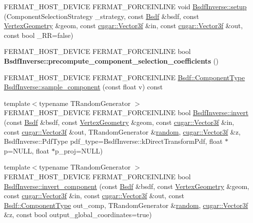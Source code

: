 \begin{DoxyCompactItemize}
\item 
F\+E\+R\+M\+A\+T\+\_\+\+H\+O\+S\+T\+\_\+\+D\+E\+V\+I\+CE F\+E\+R\+M\+A\+T\+\_\+\+F\+O\+R\+C\+E\+I\+N\+L\+I\+NE void \hyperlink{group___path_module_gaecfd88fd5ceeaef4df9d86387855e78c}{Bsdf\+Inverse\+::setup} (Component\+Selection\+Strategy \+\_\+strategy, const \hyperlink{struct_bsdf}{Bsdf} \&bsdf, const \hyperlink{struct_vertex_geometry}{Vertex\+Geometry} \&geom, const \hyperlink{structcugar_1_1_vector}{cugar\+::\+Vector3f} \&in, const \hyperlink{structcugar_1_1_vector}{cugar\+::\+Vector3f} \&out, const bool \+\_\+\+RR=false)
\item 
\mbox{\label{group___path_module_gab22cbe7216d6907a8b28597edb789c45}} 
F\+E\+R\+M\+A\+T\+\_\+\+H\+O\+S\+T\+\_\+\+D\+E\+V\+I\+CE F\+E\+R\+M\+A\+T\+\_\+\+F\+O\+R\+C\+E\+I\+N\+L\+I\+NE bool {\bfseries Bsdf\+Inverse\+::precompute\+\_\+component\+\_\+selection\+\_\+coefficients} ()
\item 
F\+E\+R\+M\+A\+T\+\_\+\+H\+O\+S\+T\+\_\+\+D\+E\+V\+I\+CE F\+E\+R\+M\+A\+T\+\_\+\+F\+O\+R\+C\+E\+I\+N\+L\+I\+NE \hyperlink{struct_bsdf_a5f7db6f81220ed9ee6da109d6eb5b585}{Bsdf\+::\+Component\+Type} \hyperlink{group___path_module_gab7b0d8544e315f99452e7798fe812be4}{Bsdf\+Inverse\+::sample\+\_\+component} (const float v) const
\item 
{\footnotesize template$<$typename T\+Random\+Generator $>$ }\\F\+E\+R\+M\+A\+T\+\_\+\+H\+O\+S\+T\+\_\+\+D\+E\+V\+I\+CE F\+E\+R\+M\+A\+T\+\_\+\+F\+O\+R\+C\+E\+I\+N\+L\+I\+NE bool \hyperlink{group___path_module_gabf86c201c8bc8e874d935f3eeae66269}{Bsdf\+Inverse\+::invert} (const \hyperlink{struct_bsdf}{Bsdf} \&bsdf, const \hyperlink{struct_vertex_geometry}{Vertex\+Geometry} \&geom, const \hyperlink{structcugar_1_1_vector}{cugar\+::\+Vector3f} \&in, const \hyperlink{structcugar_1_1_vector}{cugar\+::\+Vector3f} \&out, T\+Random\+Generator \&\hyperlink{group___sampling_module_gaec17bbbfd36295353081b7b4480d933d}{random}, \hyperlink{structcugar_1_1_vector}{cugar\+::\+Vector3f} \&z, Bsdf\+Inverse\+::\+Pdf\+Type pdf\+\_\+type=Bsdf\+Inverse\+::k\+Direct\+Transform\+Pdf, float $\ast$p=N\+U\+LL, float $\ast$p\+\_\+proj=N\+U\+LL)
\item 
{\footnotesize template$<$typename T\+Random\+Generator $>$ }\\F\+E\+R\+M\+A\+T\+\_\+\+H\+O\+S\+T\+\_\+\+D\+E\+V\+I\+CE F\+E\+R\+M\+A\+T\+\_\+\+F\+O\+R\+C\+E\+I\+N\+L\+I\+NE bool \hyperlink{group___path_module_gae150d5775f0c5c69fc21b8ab50680db6}{Bsdf\+Inverse\+::invert\+\_\+component} (const \hyperlink{struct_bsdf}{Bsdf} \&bsdf, const \hyperlink{struct_vertex_geometry}{Vertex\+Geometry} \&geom, const \hyperlink{structcugar_1_1_vector}{cugar\+::\+Vector3f} \&in, const \hyperlink{structcugar_1_1_vector}{cugar\+::\+Vector3f} \&out, const \hyperlink{struct_bsdf_a5f7db6f81220ed9ee6da109d6eb5b585}{Bsdf\+::\+Component\+Type} out\+\_\+comp, T\+Random\+Generator \&\hyperlink{group___sampling_module_gaec17bbbfd36295353081b7b4480d933d}{random}, \hyperlink{structcugar_1_1_vector}{cugar\+::\+Vector3f} \&z, const bool output\+\_\+global\+\_\+coordinates=true)

\end{DoxyCompactItemize}
